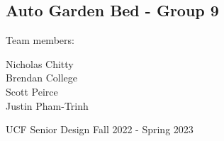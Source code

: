\begin{titlepage}
    \begin{center}
        \section{Auto Garden Bed - Group 9}
        \begin{Large}
            Team members:\\
            \vspace{.5cm}
        \end{Large}
        \begin{large}
            Nicholas Chitty \\
            Brendan College \\
            Scott Peirce \\
            Justin Pham-Trinh \\
        \end{large}
        \vfill
        UCF Senior Design Fall 2022 - Spring 2023

        \pagebreak
    \end{center}
\end{titlepage}